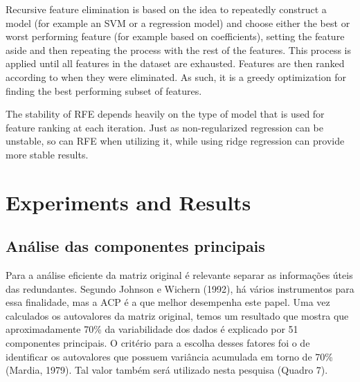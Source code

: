 Recursive feature elimination is based on the idea to repeatedly construct a model (for example an SVM or a regression model) and choose either the best or worst performing feature (for example based on coefficients), setting the feature aside and then repeating the process with the rest of the features. This process is applied until all features in the dataset are exhausted. Features are then ranked according to when they were eliminated. As such, it is a greedy optimization for finding the best performing subset of features.

The stability of RFE depends heavily on the type of model that is used for feature ranking at each iteration. Just as non-regularized regression can be unstable, so can RFE when utilizing it, while using ridge regression can provide more stable results.


\section{Experiments and Results}
\label{sec:experimentalresults}

\subsection{Análise das componentes principais}

Para a análise eficiente da matriz original  é relevante separar as informações úteis das redundantes. Segundo Johnson e Wichern (1992), há vários instrumentos para essa finalidade, mas a ACP é a que melhor desempenha este papel. 
Uma vez calculados os autovalores da matriz original, temos um resultado que mostra que aproximadamente 70\% da variabilidade dos dados é explicado por 51 componentes principais. O critério para a escolha desses fatores foi o de identificar os autovalores que possuem variância acumulada em torno de 70\% (Mardia, 1979). Tal valor também será utilizado nesta pesquisa (Quadro 7). 

